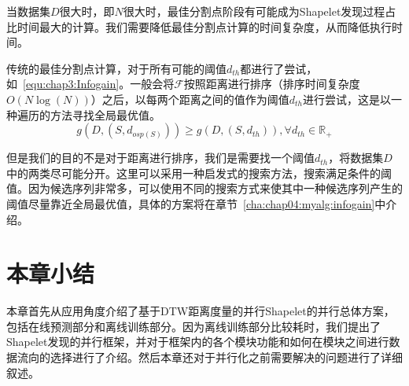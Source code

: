 当数据集$D$很大时，即$N$很大时，最佳分割点阶段有可能成为Shapelet发现过程占比时间最大的计算。我们需要降低最佳分割点计算的时间复杂度，从而降低执行时间。

传统的最佳分割点计算，对于所有可能的阈值$d_{th}$都进行了尝试，如~\ref{equ:chap3:Infogain}。一般会将$\mathcal{F}$按照距离进行排序（排序时间复杂度$O(N\log(N))$）之后，以每两个距离之间的值作为阈值$d_{th}$进行尝试，这是以一种遍历的方法寻找全局最优值。
\begin{equation}
\label{equ:chap3:Infogain}
	g(D,(S,d_{osp(S)})) \geq g(D,(S,d_{th})),\forall d_{th}\in \mathbb{R}_{+}
\end{equation}

但是我们的目的不是对于距离进行排序，我们是需要找一个阈值$d_{th}$，将数据集$D$中的两类尽可能分开。这里可以采用一种启发式的搜索方法，搜索满足条件的阈值。因为候选序列非常多，可以使用不同的搜索方式来使其中一种候选序列产生的阈值尽量靠近全局最优值，具体的方案将在章节~\ref{cha:chap04:myalg:infogain}中介绍。

\section{本章小结}

本章首先从应用角度介绍了基于DTW距离度量的并行Shapelet的并行总体方案，包括在线预测部分和离线训练部分。因为离线训练部分比较耗时，我们提出了Shapelet发现的并行框架，并对于框架内的各个模块功能和如何在模块之间进行数据流向的选择进行了介绍。然后本章还对于并行化之前需要解决的问题进行了详细叙述。




